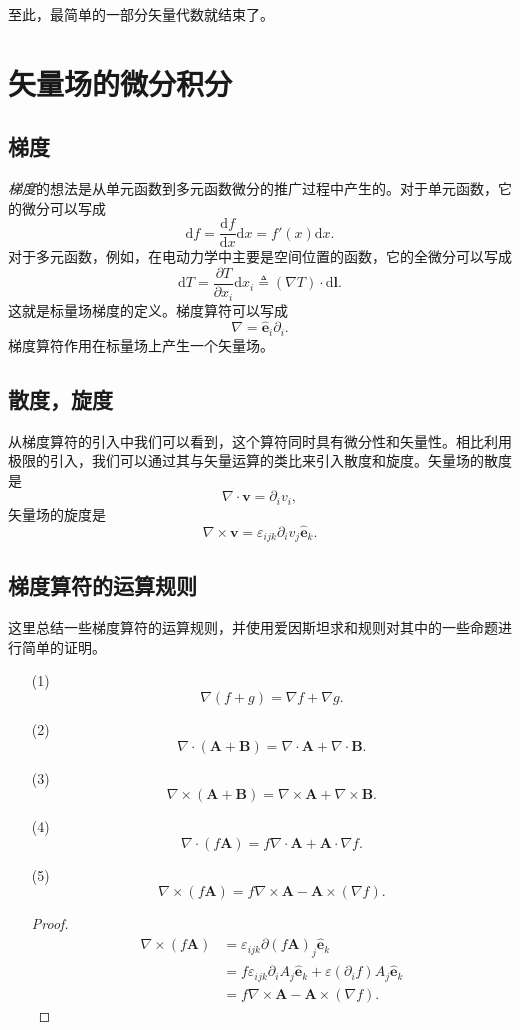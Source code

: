 \documentclass[UTF8]{ctexbook}
\renewcommand{\d}{\mathrm{d}}
\renewcommand{\b}{\boldsymbol}
\newtheorem{proof}{证明}
\numberwithin{equation}{chapter}
\begin{document}
	至此，最简单的一部分矢量代数就结束了。
	\section{矢量场的微分积分}
	\subsection{梯度}
	\emph{梯度}的想法是从单元函数到多元函数微分的推广过程中产生的。对于单元函数，它的微分可以写成
	\[\d f=\frac{\d f}{\d x}\d x = f'(x)\d x.\]
	对于多元函数，例如，在电动力学中主要是空间位置的函数，它的全微分可以写成
	\[\d T = \frac{\partial T}{\partial x_i}\d x_i \triangleq (\nabla T)\cdot\d \b{l}.\]
	这就是标量场梯度的定义。梯度算符可以写成
	\[\nabla=\hat{\b{e}}_i\partial_i.\]
	梯度算符作用在标量场上产生一个矢量场。
	
	\subsection{散度，旋度}
	从梯度算符的引入中我们可以看到，这个算符同时具有微分性和矢量性。相比利用极限的引入，我们可以通过其与矢量运算的类比来引入散度和旋度。矢量场的散度是
	\[\nabla\cdot\b{v}=\partial_iv_i,\]
	矢量场的旋度是
	\[\nabla\times\b{v}=\varepsilon_{ijk}\partial_iv_j\hat{\b{e}}_k.\]
	
	\subsection{梯度算符的运算规则}
	这里总结一些梯度算符的运算规则，并使用爱因斯坦求和规则对其中的一些命题进行简单的证明。
	\begin{itemize}
		\item[(1)]
		 \[\nabla(f+g)=\nabla f+\nabla g.\]
		 \item[(2)]
		 \[\nabla\cdot(\b{A}+\b{B})=\nabla\cdot\b{A}+\nabla\cdot\b{B}.\]
		 \item[(3)]
		 \[\nabla\times(\b{A}+\b{B})=\nabla\times\b{A}+\nabla\times\b{B}.\]
		 \item[(4)]
		 \[\nabla\cdot(f\b{A})=f\nabla\cdot\b{A}+\b{A}\cdot\nabla f.\]
		 \item[(5)]
		 \[\nabla\times(f\b{A})=f\nabla\times\b{A}-\b{A}\times(\nabla f).\]
		 \begin{proof}
		 	\begin{align*}
		 		\nabla\times(f\b{A})&=\varepsilon_{ijk}\partial(f\b{A})_j\hat{\b{e}}_k \\
		 		&=f\varepsilon_{ijk}\partial_iA_j\hat{\b{e}}_k+\varepsilon(\partial_i f)A_j\hat{\b{e}}_k \\
		 		&=f\nabla\times\b{A}-\b{A}\times(\nabla f).
		 	\end{align*}
		 \end{proof}                                          
	\end{itemize}
	
\end{document}
